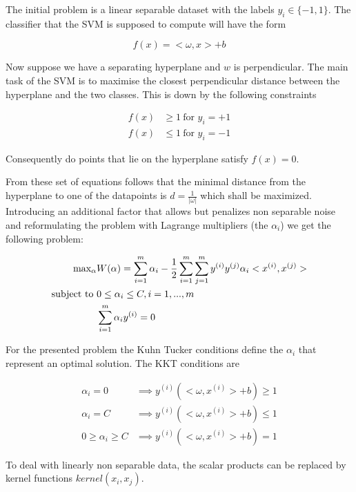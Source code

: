 The initial problem is a linear separable dataset with the labels $y_i \in \{-1, 1\}$. The classifier that the SVM is supposed to compute will have the form

\begin{equation}
    f(x) = <\omega, x> + b
\end{equation}

Now suppose we have a separating hyperplane and $w$ is perpendicular. The main task of the SVM is to maximise the closest perpendicular distance between the hyperplane and the two classes. This is down by the following constraints

\begin{align}
f(x) &\geq 1\ \text{for $y_i = +1$} \\
f(x) &\leq 1\ \text{for $y_i = -1$}
\end{align}

Consequently do points that lie on the hyperplane satisfy $f(x)=0$.

From these set of equations follows that the minimal distance from the hyperplane to one of the datapoints is $d=\frac{1}{|\omega|}$ which shall be maximized. Introducing an additional factor that allows but penalizes non separable noise and reformulating the problem with Lagrange multipliers (the $\alpha _i$) we get the following problem:

\begin{align}
\text{max}_\alpha& W(\alpha) = \sum_{i=1}^m \alpha _i - \frac{1}{2} \sum_{i=1}^m \sum_{j=1}^m y^{(i)} y^{(j)} \alpha _i <x^{(i)}, x^{(j)}> \\
\text{subject to \em} & 0\leq \alpha _i \leq C, i = 1,..., m \\
& \sum_{i=1}^m \alpha _i y^{(i)} = 0 \label{eq:sumalpha}
\end{align}

For the presented problem the Kuhn Tucker conditions define the $\alpha _i$ that represent an optimal solution. The KKT conditions are

\begin{align}
\alpha _i = 0 & \implies  y^{(i)}(<\omega, x^{(i)}> + b)  \geq 1 \\
\alpha _i = C & \implies  y^{(i)}(<\omega, x^{(i)}> + b)  \leq 1 \\
0 \geq \alpha _i \geq C & \implies  y^{(i)}(<\omega, x^{(i)}> + b)  = 1 \label{eq:alphabounds}
\end{align}

To deal with linearly non separable data, the scalar products can be replaced by kernel functions $kernel(x_i, x_j)$.


